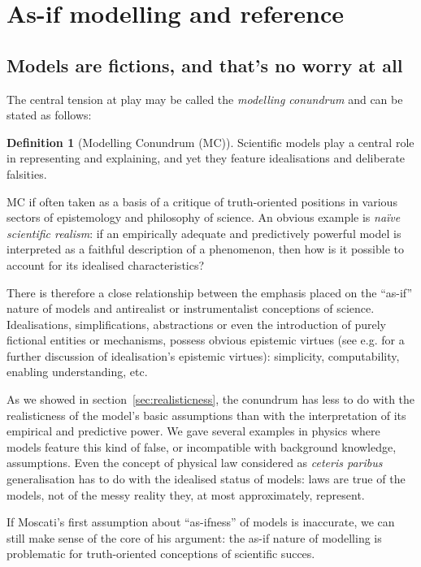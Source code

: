 \documentclass[a4paper,11pt]{article}
\theoremstyle{definition}
\newtheorem{definition}{Definition}
\begin{document}
\section{As-if modelling and reference}
\label{sec:asifVerifJust}

\subsection{Models are fictions, and that's no worry at all}

The central tension at play may be called the \textit{modelling conundrum} and can be stated as follows:

\begin{definition}[Modelling Conundrum (MC)]
    Scientific models play a central role in representing and explaining, and yet they feature idealisations and deliberate falsities.
\label{def:conundrum}
\end{definition}

MC if often taken as a basis of a critique of truth-oriented positions in various sectors of epistemology and philosophy of science. An obvious example is \textit{naïve scientific realism}: if an empirically adequate and predictively powerful model is interpreted as a faithful description of a phenomenon, then how is it possible to account for its idealised characteristics?

There is therefore a close relationship between the emphasis placed on the ``as-if'' nature of models and antirealist or instrumentalist conceptions of science. Idealisations, simplifications, abstractions or even the introduction of purely fictional entities or mechanisms, possess obvious epistemic virtues (see e.g. \citep{Sullivan2019, Lawler2019, Nawar2019, Pincock2021} for a further discussion of idealisation's epistemic virtues): simplicity, computability, enabling understanding, etc. 

As we showed in section~\ref{sec:realisticness}, the conundrum has less to do with the realisticness of the model's basic assumptions than with the interpretation of its empirical and predictive power. We gave several examples in physics where models feature this kind of false, or incompatible with background knowledge, assumptions. Even the concept of physical law considered as \textit{ceteris paribus} generalisation \citep{Cartwright1983} has to do with the idealised status of models: laws are true of the models, not of the messy reality they, at most approximately, represent.

If Moscati's first assumption about ``as-ifness'' of models is inaccurate, we can still make sense of the core of his argument: the as-if nature of modelling is problematic for truth-oriented conceptions of scientific succes.
\end{document}

